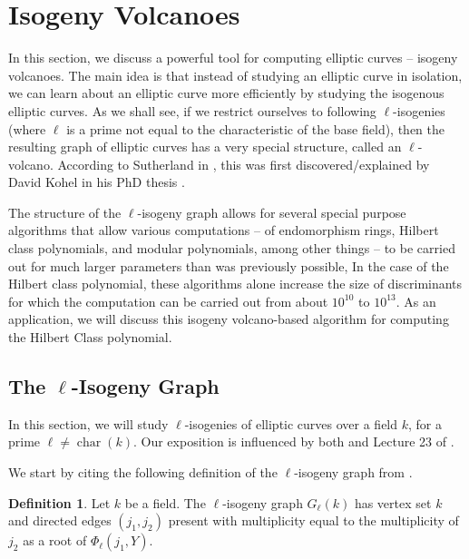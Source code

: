 \documentclass{amsart}
\theoremstyle{definition}
\newtheorem{definition}[thm]{Definition}
\theoremstyle{remark}
\numberwithin{equation}{section}
\DeclareMathOperator{\Char}{char}
\begin{document}
\section{Isogeny Volcanoes} \label{sec:IsogenyVolcanoes}

 In this section, we discuss a powerful tool for computing elliptic curves -- isogeny volcanoes. The main idea is that instead of studying an elliptic curve in isolation, we can learn about an elliptic curve more efficiently by studying the isogenous elliptic curves. As we shall see, if we restrict ourselves to following $\ell$-isogenies (where $\ell$ is a prime not equal to the characteristic of the base field), then the resulting graph of elliptic curves has a very special structure, called an $\ell$-volcano. According to Sutherland in \cite{SutherlandIV}, this was first discovered/explained by David Kohel in his PhD thesis \cite{KohelThesis}.
 
 The structure of the $\ell$-isogeny graph allows for several special purpose algorithms that allow various computations -- of endomorphism rings, Hilbert class polynomials, and modular polynomials, among other things -- to be carried out for much larger parameters than was previously possible, In the case of the Hilbert class polynomial, these algorithms alone increase the size of discriminants for which the computation can be carried out from about $10^{10}$ to $10^{13}$. As an application, we will discuss this isogeny volcano-based algorithm for computing the Hilbert Class polynomial.
 
\subsection{The $\ell$-Isogeny Graph 
} \label{subsec:IsogenyGraphs}

 
 In this section, we will study $\ell$-isogenies of elliptic curves over a field $k$, for a prime $\ell \neq \Char(k)$. Our exposition is influenced by both \cite{SutherlandIV} and Lecture 23 of \cite{SutherlandLN}. 
 
 We start by citing the following definition of the $\ell$-isogeny graph from \cite{SutherlandIV}.
 
 \begin{definition}
 Let $k$ be a field. The $\ell$-isogeny graph $G_{\ell}(k)$ has vertex set $k$ and directed edges $(j_{1}, j_{2})$ present with multiplicity equal to the multiplicity of $j_{2}$ as a root of $\Phi_{\ell}(j_{1}, Y)$. 
 \end{definition}
 
\end{document}
